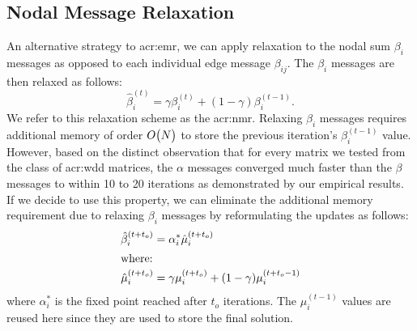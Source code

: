 \subsection{Nodal Message Relaxation}


An alternative strategy to \gls{acr:emr}, we can apply relaxation to the nodal sum $\beta_i$ messages as opposed to each individual edge message $\beta_{ij}$.
The $\beta_i$ messages are then relaxed as follows:
\begin{equation}
	\hat{\beta}_{i}^{(t)} = \gamma \beta_{i}^{(t)} + (1-\gamma)\beta_{i}^{(t-1)} \label{eq_relx_b_i}.
\end{equation}
We refer to this relaxation scheme as the \gls{acr:nmr}.
Relaxing $\beta_i$ messages requires additional memory of order $ O\bigl(N\bigr)$ to store the previous iteration's $\beta_{i}^{(t-1)}$ value.
However, based on the distinct observation that for every matrix we tested from the class of \gls{acr:wdd} matrices, the $\alpha$ messages converged much faster than the $\beta$ messages to within 10 to 20 iterations as demonstrated by our empirical results.
If we decide to use this property, we can eliminate the additional memory requirement due to relaxing $\beta_i$ messages by reformulating the updates as follows: 
\begin{align}
	\hat{\beta}_{i}^{(t+t_{o})} & =  \alpha_{i}^{*}\hat{\mu}_{i}^{(t+t_{o})}  \\
	\intertext{where:}
	\hat{\mu}_{i}^{(t+t_{o})} & =  \gamma \mu_{i}^{(t+t_{o})}+(1-\gamma)\mu_{i}^{(t+t_{o}-1)} \label{eq_relx_x_i}
\end{align}
where $\alpha_i^*$ is the fixed point reached after $t_o$ iterations.
The $\mu_{i}^{(t-1)}$ values are reused here since they are used to store the final solution.

